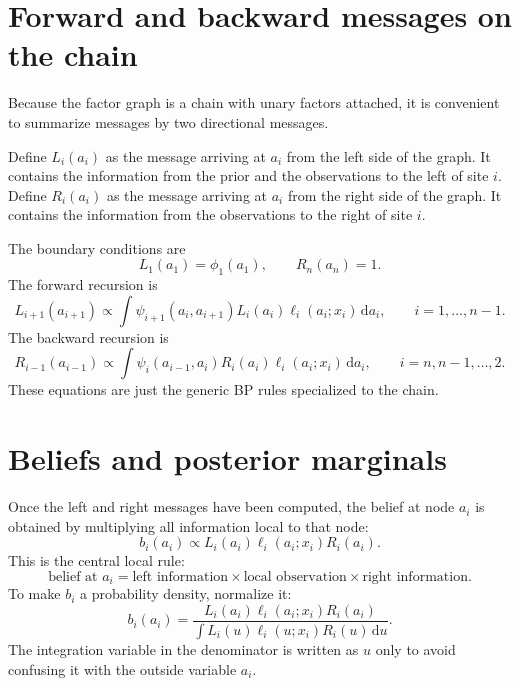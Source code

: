 \documentclass[11pt]{article}
\newcommand{\dd}{\,\mathrm{d}}
\begin{document}
\section{Forward and backward messages on the chain}

Because the factor graph is a chain with unary factors attached, it is convenient to summarize messages by two directional messages.

Define \(L_i(a_i)\) as the message arriving at \(a_i\) from the left side of the graph. It contains the information from the prior and the observations to the left of site \(i\). Define \(R_i(a_i)\) as the message arriving at \(a_i\) from the right side of the graph. It contains the information from the observations to the right of site \(i\).

The boundary conditions are
\begin{equation}
  L_1(a_1)=\phi_1(a_1),
  \qquad
  R_n(a_n)=1.
\end{equation}
The forward recursion is
\begin{equation}
  L_{i+1}(a_{i+1})
  \propto
  \int
  \psi_{i+1}(a_i,a_{i+1})
  L_i(a_i)
  \ell_i(a_i;x_i)
  \dd a_i,
  \qquad i=1,\ldots,n-1.
  \label{eq:forward-density}
\end{equation}
The backward recursion is
\begin{equation}
  R_{i-1}(a_{i-1})
  \propto
  \int
  \psi_i(a_{i-1},a_i)
  R_i(a_i)
  \ell_i(a_i;x_i)
  \dd a_i,
  \qquad i=n,n-1,\ldots,2.
  \label{eq:backward-density}
\end{equation}
These equations are just the generic BP rules specialized to the chain.

\section{Beliefs and posterior marginals}

Once the left and right messages have been computed, the belief at node \(a_i\) is obtained by multiplying all information local to that node:
\begin{equation}
  b_i(a_i)
  \propto
  L_i(a_i)\ell_i(a_i;x_i)R_i(a_i).
  \label{eq:belief-propto}
\end{equation}
This is the central local rule:
\begin{equation}
  \boxed{
  \text{belief at }a_i
  =
  \text{left information}
  \times
  \text{local observation}
  \times
  \text{right information}.
  }
\end{equation}
To make \(b_i\) a probability density, normalize it:
\begin{equation}
  b_i(a_i)
  =
  \frac{L_i(a_i)\ell_i(a_i;x_i)R_i(a_i)}{
  \int L_i(u)\ell_i(u;x_i)R_i(u)\dd u}.
  \label{eq:belief-normalized}
\end{equation}
The integration variable in the denominator is written as \(u\) only to avoid confusing it with the outside variable \(a_i\).
\end{document}
